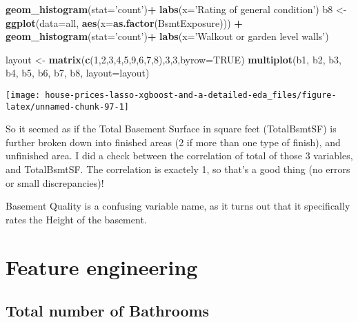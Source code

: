 \documentclass[]{article}
\newenvironment{Shaded}{\begin{snugshade}}{\end{snugshade}}
\newcommand{\KeywordTok}[1]{\textcolor[rgb]{0.13,0.29,0.53}{\textbf{#1}}}
\newcommand{\DataTypeTok}[1]{\textcolor[rgb]{0.13,0.29,0.53}{#1}}
\newcommand{\DecValTok}[1]{\textcolor[rgb]{0.00,0.00,0.81}{#1}}
\newcommand{\StringTok}[1]{\textcolor[rgb]{0.31,0.60,0.02}{#1}}
\newcommand{\OtherTok}[1]{\textcolor[rgb]{0.56,0.35,0.01}{#1}}
\newcommand{\OperatorTok}[1]{\textcolor[rgb]{0.81,0.36,0.00}{\textbf{#1}}}
\newcommand{\NormalTok}[1]{#1}
\begin{document}
\begin{Shaded}
\begin{Highlighting}[]
\StringTok{        }\KeywordTok{geom_histogram}\NormalTok{(}\DataTypeTok{stat=}\StringTok{'count'}\NormalTok{)}\OperatorTok{+}\StringTok{ }\KeywordTok{labs}\NormalTok{(}\DataTypeTok{x=}\StringTok{'Rating of general condition'}\NormalTok{)}
\NormalTok{b8 <-}\StringTok{ }\KeywordTok{ggplot}\NormalTok{(}\DataTypeTok{data=}\NormalTok{all, }\KeywordTok{aes}\NormalTok{(}\DataTypeTok{x=}\KeywordTok{as.factor}\NormalTok{(BsmtExposure))) }\OperatorTok{+}
\StringTok{        }\KeywordTok{geom_histogram}\NormalTok{(}\DataTypeTok{stat=}\StringTok{'count'}\NormalTok{)}\OperatorTok{+}\StringTok{ }\KeywordTok{labs}\NormalTok{(}\DataTypeTok{x=}\StringTok{'Walkout or garden level walls'}\NormalTok{)}

\NormalTok{layout <-}\StringTok{ }\KeywordTok{matrix}\NormalTok{(}\KeywordTok{c}\NormalTok{(}\DecValTok{1}\NormalTok{,}\DecValTok{2}\NormalTok{,}\DecValTok{3}\NormalTok{,}\DecValTok{4}\NormalTok{,}\DecValTok{5}\NormalTok{,}\DecValTok{9}\NormalTok{,}\DecValTok{6}\NormalTok{,}\DecValTok{7}\NormalTok{,}\DecValTok{8}\NormalTok{),}\DecValTok{3}\NormalTok{,}\DecValTok{3}\NormalTok{,}\DataTypeTok{byrow=}\OtherTok{TRUE}\NormalTok{)}
\KeywordTok{multiplot}\NormalTok{(b1, b2, b3, b4, b5, b6, b7, b8, }\DataTypeTok{layout=}\NormalTok{layout)}
\end{Highlighting}
\end{Shaded}

\texttt{[image: house-prices-lasso-xgboost-and-a-detailed-eda\_files/figure-latex/unnamed-chunk-97-1]}

So it seemed as if the Total Basement Surface in square feet
(TotalBsmtSF) is further broken down into finished areas (2 if more than
one type of finish), and unfinished area. I did a check between the
correlation of total of those 3 variables, and TotalBsmtSF. The
correlation is exactely 1, so that's a good thing (no errors or small
discrepancies)!

Basement Quality is a confusing variable name, as it turns out that it
specifically rates the Height of the basement.

\section{Feature engineering}\label{feature-engineering}

\subsection{Total number of Bathrooms}\label{total-number-of-bathrooms}
\end{document}
